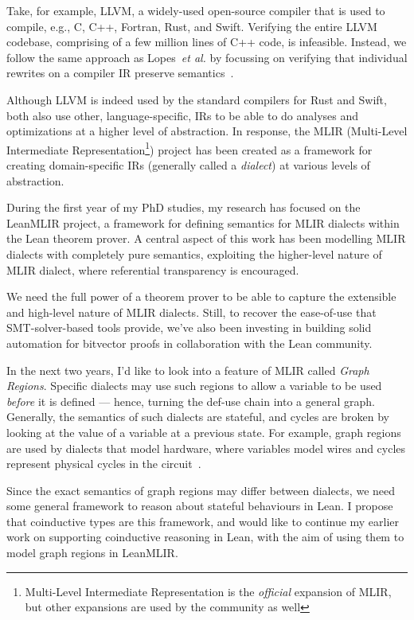 \documentclass[a4paper]{scrartcl}
\newcommand*{\etal}{~\emph{et al.}}
\begin{document}
Take, for example, LLVM, a widely-used open-source compiler that is used
to compile, e.g., C, C++, Fortran, Rust, and Swift. Verifying the entire
LLVM codebase, comprising of a few million lines of C++ code, is
infeasible. Instead, we follow the same approach as Lopes\etal{} by
focussing on verifying that individual rewrites on a compiler IR preserve
semantics~\cite{lopesAlive2BoundedTranslation2021}.

Although LLVM is indeed used by the standard compilers for Rust and
Swift, both also use other, language-specific, IRs to be able to do
analyses and optimizations at a higher level of abstraction. In
response, the MLIR (Multi-Level Intermediate Representation\footnote{Multi-Level
  Intermediate Representation is the \emph{official} expansion of MLIR,
  but other expansions are used by the community as well}) project has
been created as a framework for creating domain-specific IRs (generally
called a \emph{dialect}) at various levels of abstraction.

During the first year of my PhD studies, my research has focused on the
LeanMLIR project, a framework for defining semantics for MLIR dialects
within the Lean theorem prover. A central aspect of this work has been
modelling MLIR dialects with completely pure semantics, exploiting the
higher-level nature of MLIR dialect, where referential transparency is
encouraged.

We need the full power of a theorem prover to be able to capture the
extensible and high-level nature of MLIR dialects.
Still, to recover the ease-of-use that SMT-solver-based tools provide, 
we've also been investing in building solid automation for bitvector proofs in collaboration with the Lean community.

In the next two years, I'd like to look into a feature of MLIR called
\emph{Graph Regions}. Specific dialects may use such regions to allow a
variable to be used \emph{before} it is defined --- hence, turning the
def-use chain into a general graph. Generally, the semantics of such
dialects are stateful, and cycles are broken by looking at the value of
a variable at a previous state.
For example, graph regions are used by
dialects that model hardware,
where variables model wires and cycles represent physical cycles in the
circuit~\cite{eldridgeMLIRHardwareCompiler}.

Since the exact semantics of graph regions may differ between dialects,
we need some general framework to reason about stateful behaviours in
Lean. I propose that coinductive types are this framework, and would
like to continue my earlier work on supporting coinductive reasoning in
Lean, with the aim of using them to model graph regions in LeanMLIR.
\end{document}
